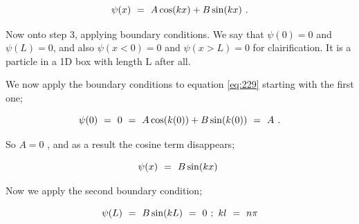 \documentclass{article}
\begin{document}
\begin{equation} \label{eq:230}
\psi(x) \hspace{0.125cm} = \hspace{0.125cm} A\cos(kx) + B\sin(kx) \hspace{0.125cm} .
\end{equation}

Now onto step 3, applying boundary conditions. We say that \begin{math} \psi(0) = 0 \end{math} and \begin{math} \psi(L) = 0 \end{math}, and also \begin{math} \psi(x < 0) = 0 \end{math} and \begin{math} \psi(x > L) = 0 \end{math} for clairification. It is a particle in a 1D box with length L after all.

We now apply the boundary conditions to equation \ref{eq:229} starting with the first one;

\begin{equation} \label{eq:231}
\psi(0) \hspace{0.125cm} = \hspace{0.125cm} 0 \hspace{0.125cm} = \hspace{0.125cm} A\cos(k(0)) + B\sin(k(0))  \hspace{0.125cm} = \hspace{0.125cm} A \hspace{0.125cm} . 
\end{equation}

So \begin{math} A = 0 \end{math} , and as a result the cosine term disappears;

\begin{equation} \label{eq:232}
\psi(x) \hspace{0.125cm} = \hspace{0.125cm} B\sin(kx) \hspace{0.125cm}
\end{equation}

Now we apply the second boundary condition;

\begin{equation} \label{eq:233}
\psi(L) \hspace{0.125cm} = \hspace{0.125cm} B\sin(kL) \hspace{0.125cm} = \hspace{0.125cm} 0 \hspace{0.125cm} ; \hspace{0.125cm} kl \hspace{0.125cm} = \hspace{0.125cm} n\pi 
\end{equation}
\end{document}
